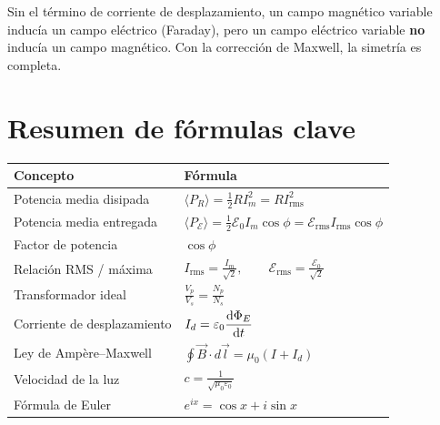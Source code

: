 \documentclass[12pt,a4paper]{article}
\begin{document}
Sin el término de corriente de desplazamiento, un campo magnético
variable inducía un campo eléctrico (Faraday), pero un campo
eléctrico variable \textbf{no} inducía un campo magnético. Con la
corrección de Maxwell, la simetría es completa.

\section*{Resumen de fórmulas clave}

\begin{table}[H]
  \centering
  \begin{tabularx}{\textwidth}{l X}
    \toprule
    \textbf{Concepto} & \textbf{Fórmula} \\
    \midrule
    Potencia media disipada
    & \(\displaystyle \langle P_R \rangle
       = \frac12 R I_m^2 = R I_{\text{rms}}^2\) \\[6pt]
    Potencia media entregada
    & \(\displaystyle \langle P_{\mathcal{E}} \rangle
       = \frac12 \mathcal{E}_0 I_m \cos\phi
       = \mathcal{E}_{\text{rms}} I_{\text{rms}} \cos\phi\) \\[6pt]
    Factor de potencia & \(\cos\phi\) \\[6pt]
    Relación RMS / máxima
    & \(\displaystyle I_{\text{rms}} = \frac{I_m}{\sqrt{2}},\qquad
       \mathcal{E}_{\text{rms}} = \frac{\mathcal{E}_0}{\sqrt{2}}\) \\[6pt]
    Transformador ideal
    & \(\displaystyle \frac{V_p}{V_s} = \frac{N_p}{N_s}\) \\[6pt]
    Corriente de desplazamiento
    & \(\displaystyle I_d = \varepsilon_0 \dv{\Phi_E}{t}\) \\[6pt]
    Ley de Ampère--Maxwell
    & \(\displaystyle \oint \vec B \cdot d\vec l
       = \mu_0 (I + I_d)\) \\[6pt]
    Velocidad de la luz
    & \(\displaystyle c = \frac{1}{\sqrt{\mu_0 \varepsilon_0}}\) \\[6pt]
    Fórmula de Euler
    & \(e^{ix} = \cos x + i \sin x\) \\
    \bottomrule
  \end{tabularx}
\end{table}
\end{document}
